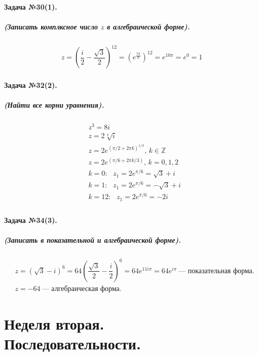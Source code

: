 \documentclass[a4paper,12pt]{report}
\begin{document}
\paragraph{Задача №30(1).}
\subparagraph{(Записать комплксное число $ z $ в алгебраической форме).}

\begin{align*}
	z=
	\left(
		\dfrac{i}{2}-\dfrac{\sqrt{3}}{2}	
	\right)^{12}=
	\left(	
		e^\frac{5\pi}{6}
	\right)^{12}=
	e^{10\pi}=e^0=1
\end{align*}

\paragraph{Задача №32(2).}
\subparagraph{(Найти все корни уравнения).}

\begin{align*}
	&z^3=8i\\
	&z=2\sqrt[3]{i}\\
	&z=2e^{(\pi /2+2\pi k)^{1/3}}
	\text{, } k \in \mathbb{Z}\\
	&z=2e^{(\pi/6+2\pi k/3)}
	\text{, }k=0,1,2\\
	&k=0: 
	\text{ }
	z_1=2e^{\pi /6}=\sqrt{3}+i\\
	&k=1: 
	\text{ }
	z_1=2e^{\pi /6}=-\sqrt{3}+i\\
	&k=12: 
	\text{ }
	z_1=2e^{\pi /6}=-2i\\[44pt]
\end{align*}

\paragraph{Задача №34(3).}
\subparagraph{(Записать в показательной и алгебраической форме).}

\begin{align*}	
	&z=(\sqrt{3}-i)^6=
	64
	\left(
		\dfrac{\sqrt{3}}{2}-\dfrac{i}{2}
	\right)^6=
	64e^{11i\pi}=64e^{i\pi}~\text{--- показательная форма.}\\
	&z=-64~\text{--- алгебраическая форма.}
\end{align*}

\section*{Неделя вторая.\\ Последовательности.}
\end{document}
